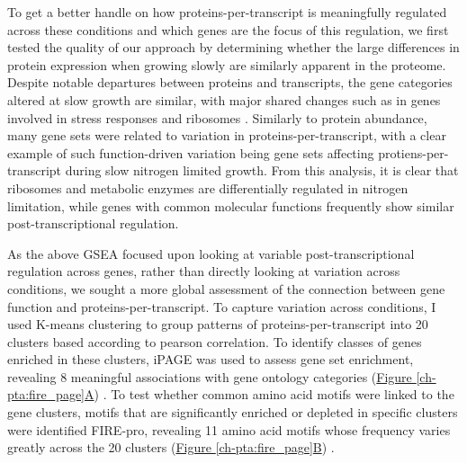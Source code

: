 To get a better handle on how proteins-per-transcript is meaningfully regulated across these conditions and which genes are the focus of this regulation, we first tested the quality of our approach by determining whether the large differences in protein expression when growing slowly are similarly apparent in the proteome. Despite notable departures between proteins and transcripts, the gene categories altered at slow growth are similar, with major shared changes such as in genes involved in stress responses and ribosomes \cite{Brauer:2008jn}. Similarly to protein abundance, many gene sets were related to variation in proteins-per-transcript, with a clear example of such function-driven variation being gene sets affecting protiens-per-transcript during slow nitrogen limited growth. From this analysis, it is clear that ribosomes and metabolic enzymes are differentially regulated in nitrogen limitation, while genes with common molecular functions frequently show similar post-transcriptional regulation.

As the above GSEA focused upon looking at variable post-transcriptional regulation across genes, rather than directly looking at variation across conditions, we sought a more global assessment of the connection between gene function and proteins-per-transcript. To capture variation across conditions, I used K-means clustering to group patterns of proteins-per-transcript into 20 clusters based according to pearson correlation.  To identify classes of genes enriched in these clusters, iPAGE was used to assess gene set enrichment, revealing 8 meaningful associations with gene ontology categories (\hyperref[ch-pta:fire_page]{Figure \ref{ch-pta:fire_page}A}) \cite{Goodarzi:2009cf}. To test whether common amino acid motifs were linked to the gene clusters, motifs that are significantly enriched or depleted in specific clusters were identified FIRE-pro, revealing 11 amino acid motifs whose frequency varies greatly across the 20 clusters (\hyperref[ch-pta:fire_page]{Figure \ref{ch-pta:fire_page}B}) \cite{Lieber:2010fr}.


